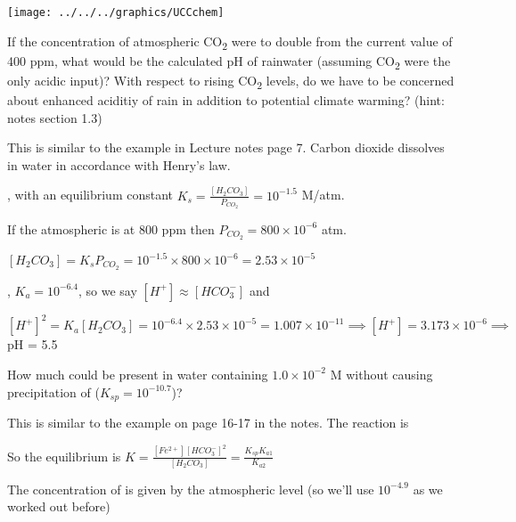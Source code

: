 \documentclass[addpoints,12pt]{exam}
\begin{document}
\begin{center}
\texttt{[image: ../../../graphics/UCCchem]}

\end{center}
\vspace{0.1in}

\begin{questions}
\question
If the concentration of atmospheric CO\textsubscript{2}  were to double from the current value of 400 ppm, what would be the calculated pH of rainwater (assuming CO\textsubscript{2}  were the only acidic input)? With respect to rising CO\textsubscript{2}  levels, do we have to be concerned about enhanced aciditiy of rain in addition to potential climate warming? (hint: notes section 1.3)

\begin{solution} {\color{red}
This is similar to the example in Lecture notes page 7. Carbon dioxide dissolves in water in accordance with Henry's law. 

, \quad with an equilibrium constant \(K_s = \frac{[H_2CO_3]}{P_{CO_2}} = 10^{-1.5}\) M/atm.

If the atmospheric  is at 800 ppm then \(P_{CO_2} = 800 \times 10^{-6}\) atm.

\([H_2CO_3] = K_sP_{CO_2} = 10^{-1.5} \times 800 \times 10^{-6} = 2.53 \times 10^{-5}\)

, \(K_a = 10^{-6.4}\), so we say \([H^+] \approx [HCO_3^-]\) and

\([H^+]^2 = K_a[H_2CO_3] = 10^{-6.4} \times 2.53\times 10^{-5} = 1.007\times10^{-11} \implies [H^+] = 3.173\times 10^{-6} \implies\) pH = 5.5}
\end{solution}

\question
How much  could be present in water containing \(1.0 \times 10^{-2}\) M  without causing precipitation of  (\(K_{sp} = 10^{-10.7}\))?


\begin{solution} {\color{red} This is similar to the example on page 16-17 in the notes. The reaction is 
 
 So the equilibrium is \(K = \frac{[Fe^{2+}][HCO_3^-]^2}{[H_2CO_3]} = \frac{K_{sp}K_{a1}}{K_{a2}}\)
 
 The concentration of  is given by the atmospheric level (so we'll use \(10^{-4.9}\) as we worked out before)
 
}
\end{solution}
\end{questions}
\end{document}
